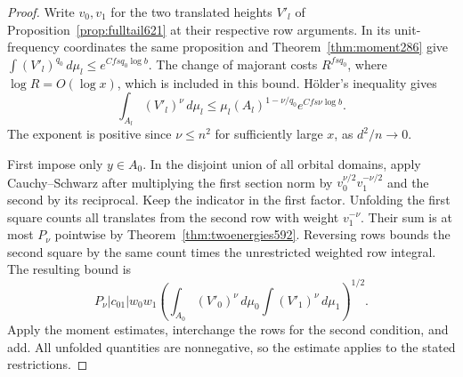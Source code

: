 \documentclass[a4paper,11pt]{article}
\theoremstyle{definition}
\theoremstyle{remark}
\numberwithin{equation}{section}
\begin{document}
\begin{proof}
Write \(v_0,v_1\) for the two translated heights \(V'_l\) of
Proposition~\ref{prop:fulltail621} at their respective row
arguments. In its unit-frequency coordinates the same proposition
and Theorem~\ref{thm:moment286} give
\(\int (V'_l)^{q_0}\,d\mu_l\le e^{Cfsq_0\log b}\).
The change of majorant costs \(R^{fsq_0}\), where
\(\log R=O(\log x)\), which is included in this bound.
H\"older's inequality gives
\[
 \int_{A_l}(V'_l)^\nu\,d\mu_l
     \le \mu_l(A_l)^{1-\nu/q_0}e^{Cfs\nu\log b}.
\]
The exponent is positive since \(\nu\le n^2\) for sufficiently
large \(x\), as \(d^2/n\to0\).

First impose only \(y\in A_0\). In the disjoint union of all
orbital domains, apply Cauchy--Schwarz after multiplying the
first section norm by \(v_0^{\nu/2}v_1^{-\nu/2}\) and the second
by its reciprocal. Keep the indicator in the first factor.
Unfolding the first square counts all translates from the second
row with weight \(v_1^{-\nu}\). Their sum is at most \(P_\nu\)
pointwise by Theorem~\ref{thm:twoenergies592}. Reversing rows
bounds the second square by the same count times the unrestricted
weighted row integral. The resulting bound is
\[
 P_\nu |c_{01}|w_0w_1
 \left(\int_{A_0}(V'_0)^\nu\,d\mu_0
             \int(V'_1)^\nu\,d\mu_1\right)^{1/2}.
\]
Apply the moment estimates, interchange the rows for the second
condition, and add. All unfolded quantities are nonnegative,
so the estimate applies to the stated restrictions.
\end{proof}
\end{document}
